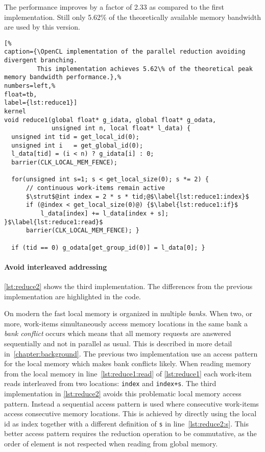 The performance improves by a factor of 2.33 as compared to the first implementation.
Still only 5.62\% of the theoretically available memory bandwidth are used by this version.

\begin{lstlisting}[%                                                             
caption={\OpenCL implementation of the parallel reduction avoiding divergent branching.
         This implementation achieves 5.62\% of the theoretical peak memory bandwidth performance.},%
numbers=left,%
float=tb,
label={lst:reduce1}]
kernel
void reduce1(global float* g_idata, global float* g_odata,
             unsigned int n, local float* l_data) {
  unsigned int tid = get_local_id(0);
  unsigned int i   = get_global_id(0);
  l_data[tid] = (i < n) ? g_idata[i] : 0;
  barrier(CLK_LOCAL_MEM_FENCE);

  for(unsigned int s=1; s < get_local_size(0); s *= 2) {
      // continuous work-items remain active
      $\strut$@int index = 2 * s * tid;@$\label{lst:reduce1:index}$
      if (@index < get_local_size(0)@) {$\label{lst:reduce1:if}$
          l_data[index] += l_data[index + s]; }$\label{lst:reduce1:read}$
      barrier(CLK_LOCAL_MEM_FENCE); }

  if (tid == 0) g_odata[get_group_id(0)] = l_data[0]; }
\end{lstlisting}


\paragraph{Avoid interleaved addressing}

\autoref{lst:reduce2} shows the third implementation.
The differences from the previous implementation are highlighted in the code.

On modern \GPUs the fast local memory is organized in multiple \emph{banks}.
When two, or more, work-items simultaneously access memory locations in the same bank a \emph{bank conflict} occurs which means that all memory requests are answered sequentially and not in parallel as usual.
This is described in more detail in~\autoref{chapter:background}.
The previous two implementation use an access pattern for the local memory which makes bank conflicts likely.
When reading memory from the local memory in line~\ref{lst:reduce1:read} of \autoref{lst:reduce1} each work-item reads interleaved from two locations: \lstinline!index! and \lstinline!index+s!.
The third implementation in \autoref{lst:reduce2} avoids this problematic local memory access pattern.
Instead a sequential access pattern is used where consecutive work-items access consecutive memory locations.
This is achieved by directly using the local id as index together with a different definition of \lstinline!s! in line~\ref{lst:reduce2:s}.
This better access pattern requires the reduction operation to be commutative, as the order of element is not respected when reading from global memory.


